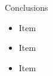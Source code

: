 \begin{frame}{Conclusions}

\begin{itemize}
\item Item
\vfill \item  Item
\vfill \item  Item
\end{itemize}

\end{frame}


